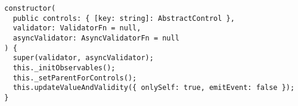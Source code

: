 \begin{verbatim}
  constructor(
    public controls: { [key: string]: AbstractControl },
    validator: ValidatorFn = null,
    asyncValidator: AsyncValidatorFn = null
  ) {
    super(validator, asyncValidator);
    this._initObservables();
    this._setParentForControls();
    this.updateValueAndValidity({ onlySelf: true, emitEvent: false });
  }
\end{verbatim}
